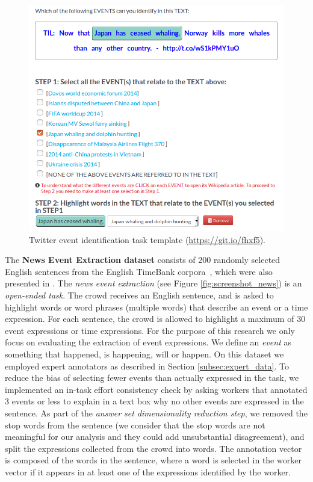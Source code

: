 \begin{figure}[htb!]
\centering
\includegraphics[width=0.8\linewidth]{img/tweets.png}
\caption{Twitter event identification task template (\url{https://git.io/fhxf5}).}
\label{fig:screenshot_tweets}
\end{figure}

The \textbf{News Event Extraction dataset} consists of 200 randomly selected English sentences from the English TimeBank corpora~\cite{pustejovsky2003timebank}, which were also presented in \cite{CASELLI16.966}. The \emph{news event extraction} (see Figure \ref{fig:screenshot_news}) is an \textit{open-ended task}. The crowd receives an English sentence, and is asked to highlight words or word phrases (multiple words) that describe an event or a time expression. For each sentence, the crowd is allowed to highlight a maximum of 30 event expressions or time expressions. For the purpose of this research we only focus on evaluating the extraction of event expressions. We define an \emph{event} as something that happened, is happening, will or happen. On this dataset we employed expert annotators as described in Section \ref{subsec:expert_data}. To reduce the bias of selecting fewer events than actually expressed in the task, we implemented an in-task effort consistency check by asking workers that annotated 3 events or less to explain in a text box why no other events are expressed in the sentence. As part of the \textit{answer set dimensionality reduction step}, we removed the stop words from the sentence (we consider that the stop words are not meaningful for our analysis and they could add unsubstantial disagreement), and split the expressions collected from the crowd into words.  The annotation vector is composed of the words in the sentence, where a word is selected in the worker vector if it appears in at least one of the expressions identified by the worker.

